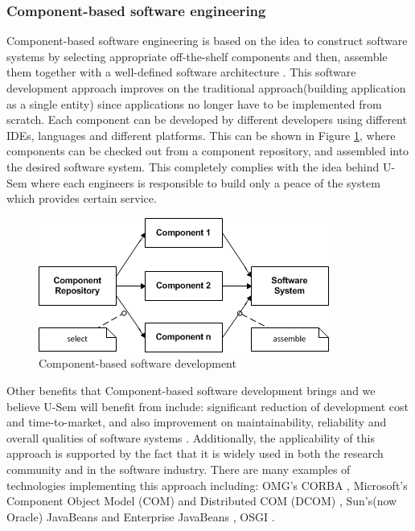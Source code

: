 \subsubsection{Component-based software engineering}

Component-based software engineering is based on the idea to construct software systems by selecting appropriate off-the-shelf components and then, assemble them together with a well-defined software architecture \cite{pour1998component}. This software development approach improves on the traditional approach(building application as a single entity) since applications no longer have to be implemented from scratch. Each component can be developed by different developers using different IDEs, languages and different platforms. This can be shown in Figure \ref{fig_cbsd}, where components can be checked out from a component repository, and assembled into the desired software system. This completely complies with the idea behind U-Sem where each engineers is responsible to build only a peace of the system which provides certain service.

\begin{figure}[h!]
  \centering
  	\includegraphics[scale=0.75]{plug-in/component-based.png}
  \caption{Component-based software development \cite{pour1998component} }
  \label{fig_cbsd}
\end{figure}

Other benefits that Component-based software development brings and we believe U-Sem will benefit from include: significant reduction of development cost and time-to-market, and also improvement on maintainability, reliability and overall qualities of software systems \cite{pour1999enterprise} \cite{pour1999making}. Additionally, the applicability of this approach is supported by the fact that it is widely used in both the research community and in the software industry. There are many examples of technologies implementing this approach including: OMG's CORBA \cite{vinoski1997corba},  Microsoft's Component Object Model (COM) and Distributed COM (DCOM) \cite{vinoski1997corba}, Sun's(now Oracle) JavaBeans and Enterprise JavaBeans \cite{goncalves2010enterprise}, OSGI \cite{tavares2008gentle}.


